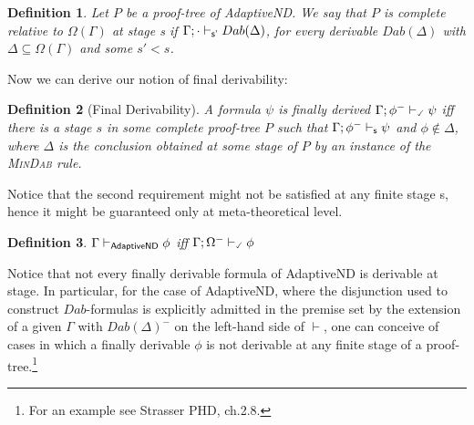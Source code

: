 \documentclass[]{article}
\newtheorem{definition}{Definition}
\newcommand{\TurnADND}[2]
	{ {#1}\vdash_{\textbf{\sf AdaptiveND}}  {#2}}
\newcommand{\Turn}[2]
	{ {#1}\vdash_{\textbf{\sf s}}  {#2}}
\newcommand{\TurnPrime}[2]
	{ {#1}\vdash_{\textbf{\sf s'}}  {#2}}
\newcommand{\TurnPrimePrime}[2]
	{ {#1}\vdash_{\textbf{\sf s''}}  {#2}}
\newcommand{\TurnMarked}[2]
	{ {#1}\vdash_{\textbf{\sf s\XBox}}  {#2}}
\newcommand{\TurnChecked}[2]
	{ {#1}\vdash_{\textbf{\sf \checked}}  {#2}}
\newcommand{\TurnMarkedprime}[2]
	{ {#1}\vdash_{\textbf{\sf s'\XBox}}  {#2}}
\begin{document}
\begin{definition}
Let $P$ be a proof-tree of {\sf AdaptiveND}. We say that $P$ is complete relative to $\Omega(\Gamma)$ at stage {\sf s} if  $\TurnPrime{\Gamma;\cdot}{Dab(\Delta)}$, for every derivable $Dab(\Delta)$ with $\Delta\subseteq\Omega(\Gamma)$ and some $s'<s$.

%
\end{definition}



Now we can derive our notion of final derivability:

\begin{definition}[Final Derivability]
A formula $\psi$ is finally derived $\TurnChecked{\Gamma;\phi^{-}}{\psi}$ iff there is a stage $s$  in some complete proof-tree $P$
 such that $\Turn{\Gamma;\phi^{-}}{\psi}$%
and $\phi \notin \Delta$, where $\Delta$ is the conclusion obtained  at some stage of $P$ by an instance of the \textsc{MinDab} rule. 
\end{definition}
%
Notice that the second requirement might not be satisfied at any finite stage {\sf s}, hence it might be guaranteed only at meta-theoretical level.


\begin{definition}
$\TurnADND{\Gamma}{\phi}$ iff $\TurnChecked{\Gamma;\Omega^{-}}{\phi}$
\end{definition}
%
Notice that not every finally derivable formula of {\sf AdaptiveND} is derivable at stage. In particular, for the case of {\sf AdaptiveND}, where the disjunction used to construct $Dab$-formulas is explicitly admitted in the premise set by the extension of a given $\Gamma$ with $Dab(\Delta)^{-}$ on the left-hand side of $\vdash$, one can conceive of cases in which a finally derivable $\phi$ is not derivable at any finite stage of a proof-tree.\footnote{For an example see Strasser PHD, ch.2.8.} 
\end{document}
